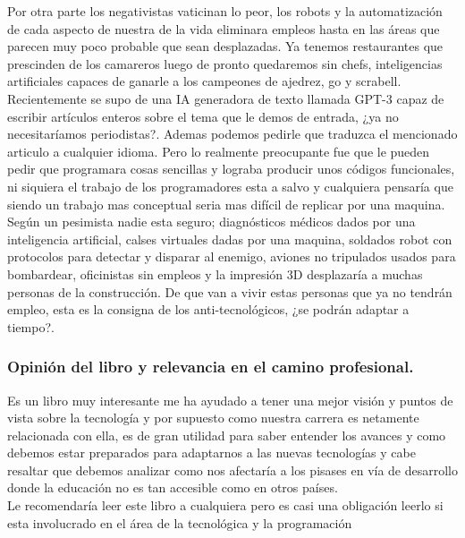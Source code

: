\documentclass[journal]{IEEEtran}
\begin{document}
Por otra parte los negativistas vaticinan lo peor, los robots y la automatización de cada aspecto de nuestra de la vida eliminara empleos hasta en las áreas que parecen muy poco probable que sean desplazadas. Ya tenemos restaurantes que prescinden de los camareros luego de pronto quedaremos sin chefs, inteligencias artificiales capaces de ganarle a los campeones de ajedrez, go y scrabell.\\ Recientemente se supo de una IA generadora de texto llamada GPT-3 capaz de escribir artículos enteros sobre el tema que le demos de entrada, ¿ya no necesitaríamos periodistas?. Ademas podemos pedirle que traduzca el mencionado articulo a cualquier idioma. Pero lo realmente preocupante fue que le pueden pedir que programara cosas sencillas y lograba producir unos códigos funcionales, ni siquiera el trabajo de los programadores esta a salvo y cualquiera pensaría que siendo un trabajo mas conceptual seria mas difícil de replicar por una maquina.\\ Según un pesimista nadie esta seguro; diagnósticos médicos dados por una inteligencia artificial, calses virtuales dadas por una maquina, soldados robot con protocolos para detectar y disparar al enemigo, aviones no tripulados usados para bombardear, oficinistas sin empleos y la impresión 3D desplazaría a muchas personas de la construcción. De que van a vivir estas personas que ya no tendrán empleo, esta es la consigna de los anti-tecnológicos, ¿se podrán adaptar a tiempo?.

\subsubsection{Opinión del libro y relevancia en el camino profesional.}
Es un libro muy interesante me ha ayudado a tener una mejor visión y puntos de vista sobre la tecnología y por supuesto como nuestra carrera es netamente relacionada con ella, es de gran utilidad para saber entender los avances y como debemos estar preparados para adaptarnos a las nuevas tecnologías y cabe resaltar que debemos analizar como nos afectaría a los pisases en vía de desarrollo donde la educación no es tan accesible como en otros países.\\Le recomendaría leer este libro a cualquiera pero es casi una obligación leerlo si esta involucrado en el área de la tecnológica y la programación
\end{document}
